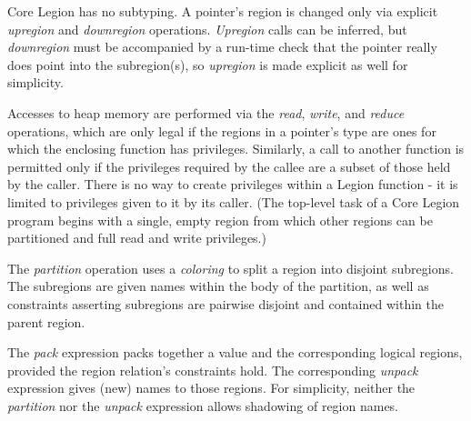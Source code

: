 Core Legion has no subtyping. A pointer's region is changed only via explicit
{\em upregion} and {\em downregion} operations.  {\em Upregion} calls can be inferred,
but {\em downregion} must be accompanied by a run-time check that the pointer really does
point into the subregion(s), so {\em upregion} is made explicit as well for simplicity.

Accesses to heap memory are performed via the {\em read}, {\em write}, and {\em reduce}
operations, which are only legal if the regions in a pointer's type are ones for which the
enclosing function has privileges.
Similarly, a call to another function is permitted only if the privileges required by the 
callee are a subset of those held by the caller.  There is no way to create privileges within
a Legion function - it is limited to privileges given to it by its caller.  (The
top-level task of a Core Legion program begins with a single, empty region from which other
regions can be partitioned and full read and
write privileges.)

The {\em partition} operation uses a {\em coloring} to split a region into 
disjoint subregions.  The subregions are given names within the body of the partition,
as well as constraints asserting subregions are pairwise disjoint and contained within the parent region.

The {\em pack} expression packs together a value and the corresponding logical regions,
provided the region relation's constraints hold.  The
corresponding {\em unpack} expression gives (new) names to those regions.  For simplicity, neither the 
{\em partition} nor the {\em unpack} expression allows shadowing of region names.

